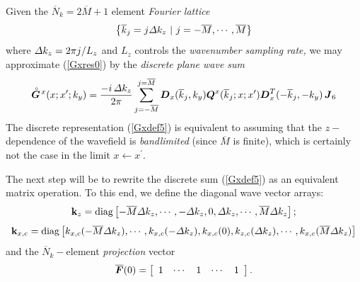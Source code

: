 Given the $\overline{N}_k=2 \overline{M}+1$ element {\em Fourier lattice\/}  
\begin{equation} \label{pxspec}
\left\{ 
 \overline{k}_{j} =j {\mit \Delta} k_{z} \ |\  j=-\overline{M},\cdots 
 ,\overline{M} 
\right\} 
\end{equation} 
where ${\mit \Delta} k_{z} =2 \pi  j/L_{z}$ and   $L_{z}$ 
controls the  {\em wavenumber sampling rate,\/} we may approximate 
(\ref{Gxres0}) by the {\em discrete 
plane wave sum\/}
\begin{equation} \label{Gxdef5}
\stackrel{\scriptscriptstyle _{\,\,\circ}}{ \mbox{\boldmath$\mit G$\unboldmath}}\!{}^{x}({ x};{ x}^{\prime};k_y)=\frac{- i\,{\mit \Delta} {k}_{z}}{2 \pi} 
\sum\limits_{{j=-\overline{M}}}^{j=\overline{M}}
{\mbox{\boldmath$\mit D$\unboldmath}}_{x}(\overline{k}_{j},{k}_{y})
{\mbox{\boldmath$\mit Q$\unboldmath}}^{x}(\overline{k}_{j};x;x^{\prime}){\mbox{\boldmath$\mit D$\unboldmath}}_{x}^{T}(-\overline{k}_{j},-{k}_{y})
\,{\mbox{\boldmath$\mit J$\unboldmath}}_6
\end{equation} 
The discrete representation (\ref{Gxdef5}) is equivalent to assuming that the 
$z-$dependence of the wavefield is {\em  bandlimited\/} (since $\overline{M}$ is 
finite), which is certainly not the case in the limit $x \leftarrow 
x^{\prime}$.



The next step will be to rewrite the discrete sum (\ref{Gxdef5}) as an 
equivalent matrix operation. To this end, we define the diagonal wave 
vector arrays:
\begin{equation} \label{gbarKz}
{\bf  k}_{z} =\mbox{diag}\left[{-\overline{M} {\mit \Delta} k_{z},\cdots,-{\mit 
\Delta} k_{z},0,
{\mit \Delta} k_{z},\cdots, \overline{M} {\mit \Delta} k_{z}}\right];
\end{equation} 
\begin{equation} \label{gbarKx}
{\bf  k}_{x,c} =\mbox{diag}\left[{{ k}_{x,c}(-\overline{M} {\mit \Delta} k_{z}),\cdots,
{ k}_{x,c}(-{\mit \Delta} k_{z}),
{ k}_{x,c}(0),
{ k}_{z,c}({\mit \Delta} k_{z}),\cdots, { k}_{x,c}(\overline{M}{\mit \Delta} k_{z})}\right]
\end{equation} 
and the $\overline{N}_k-$element {\em projection \/} vector
\begin{equation} \label{Fbardef}
\overline{\mbox{\boldmath$\mit F$\unboldmath}}(0)=\left[\begin{array}{ccccc}
1& \cdots & 
1& \cdots & 
1\end{array}\right].
\end{equation} 


